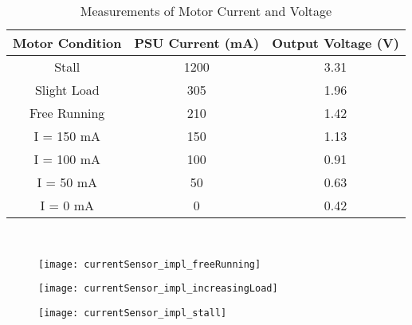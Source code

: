 \begin{table}[!h]
   \centering
   \begin{tabular}{ |c|c|c| }
      \hline
      \textbf{Motor Condition}         & \textbf{PSU Current (mA)}        & \textbf{Output  Voltage (V)}       \\ \hline
      Stall                            & 1200                             & 3.31                               \\ \hline
      Slight Load                      & 305                              & 1.96                               \\ \hline
      Free Running                     & 210                              & 1.42                               \\ \hline
      I = 150 mA                       & 150                              & 1.13                               \\ \hline
      I = 100 mA                       & 100                              & 0.91                               \\ \hline
      I = 50 mA                        & 50                               & 0.63                               \\ \hline
      I = 0 mA                         & 0                                & 0.42                               \\ \hline
   \end{tabular}\
   \caption{Measurements of Motor Current and Voltage}
   \label{table:motor_currents}   
\end{table}

\begin{figure}[!h]
   \centering
   \begin{minipage}{0.3\textwidth}
      \centering
      \texttt{[image: currentSensor\_impl\_freeRunning]}
   \end{minipage}
   \begin{minipage}{0.3\textwidth}
      \centering
      \texttt{[image: currentSensor\_impl\_increasingLoad]}
   \end{minipage}
   \begin{minipage}{0.3\textwidth}
      \centering
      \texttt{[image: currentSensor\_impl\_stall]}
   \end{minipage}   
\end{figure}